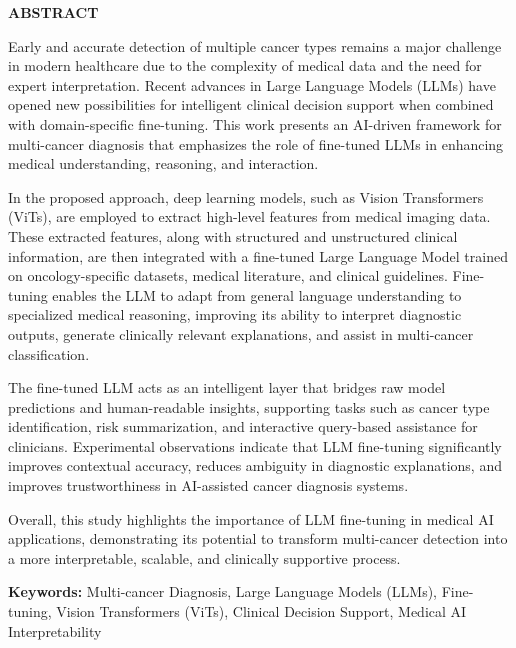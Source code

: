 \documentclass[a4paper,12pt]{report}
\begin{document}
\begin{doublespace} 

\begin{center}
    \textbf{\Large ABSTRACT}
\end{center}

\noindent Early and accurate detection of multiple cancer types remains a major challenge in modern healthcare due to the complexity of medical data and the need for expert interpretation. Recent advances in Large Language Models (LLMs) have opened new possibilities for intelligent clinical decision support when combined with domain-specific fine-tuning. This work presents an AI-driven framework for multi-cancer diagnosis that emphasizes the role of fine-tuned LLMs in enhancing medical understanding, reasoning, and interaction.

\noindent In the proposed approach, deep learning models, such as Vision Transformers (ViTs), are employed to extract high-level features from medical imaging data. These extracted features, along with structured and unstructured clinical information, are then integrated with a fine-tuned Large Language Model trained on oncology-specific datasets, medical literature, and clinical guidelines. Fine-tuning enables the LLM to adapt from general language understanding to specialized medical reasoning, improving its ability to interpret diagnostic outputs, generate clinically relevant explanations, and assist in multi-cancer classification.

\noindent The fine-tuned LLM acts as an intelligent layer that bridges raw model predictions and human-readable insights, supporting tasks such as cancer type identification, risk summarization, and interactive query-based assistance for clinicians. Experimental observations indicate that LLM fine-tuning significantly improves contextual accuracy, reduces ambiguity in diagnostic explanations, and improves trustworthiness in AI-assisted cancer diagnosis systems.

\noindent Overall, this study highlights the importance of LLM fine-tuning in medical AI applications, demonstrating its potential to transform multi-cancer detection into a more interpretable, scalable, and clinically supportive process.

\vspace{0.5cm}

\noindent \textbf{Keywords:} Multi-cancer Diagnosis, Large Language Models (LLMs), Fine-tuning, Vision Transformers (ViTs), Clinical Decision Support, Medical AI Interpretability

\end{doublespace}
\newpage
\newpage
\end{document}

